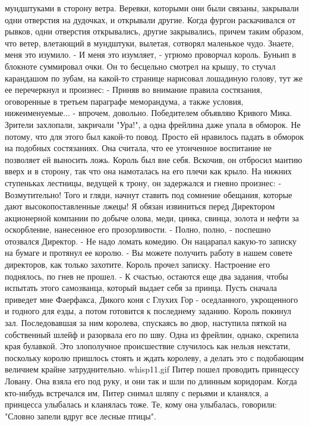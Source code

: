 мундштуками в сторону ветра. Веревки, которыми они были связаны, 
закрывали одни отверстия на дудочках, и открывали другие. Когда фургон 
раскачивался от рывков, одни отверстия открывались, другие 
закрывались, причем таким образом, что ветер, влетающий в мундштуки, 
вылетая, сотворял маленькое чудо. Знаете, меня это изумило.
    - И меня это изумляет, - угрюмо проворчал король.
    Буньип в блокноте суммировал очки. Он то бесцельно смотрел на 
крышу, то стучал карандашом по зубам, на какой-то странице нарисовал 
лошадиную голову, тут же ее перечеркнул и произнес:
    - Приняв во внимание правила состязания, оговоренные в третьем 
параграфе меморандума, а также условия, нижеименуемые... - впрочем, 
довольно. Победителем объявляю Кривого Мика.
    Зрители захлопали, закричали "Ура!", а одна фрейлина даже упала в 
обморок. Не потому, что для этого был какой-то повод. Просто ей 
нравилось падать в обморок на подобных состязаниях. Она считала, что 
ее утонченное воспитание не позволяет ей выносить ложь.
    Король был вне себя. Вскочив, он отбросил мантию вверх и в 
сторону, так что она намоталась на его плечи как крыло. На нижних 
ступеньках лестницы, ведущей к трону, он задержался и гневно произнес:
    - Возмутительно! Того и гляди, начнут ставить под сомнение 
обещания, которые дают высокопоставленные лжецы! Я обязан извиниться 
перед Директором акционерной компании по добыче олова, меди, цинка, 
свинца, золота и нефти за оскорбление, нанесенное его прозорливости.
    - Полно, полно, - поспешно отозвался Директор. - Не надо ломать 
комедию.
    Он нацарапал какую-то записку на бумаге и протянул ее королю.
    - Вы можете получить работу в нашем совете директоров, как только 
захотите.
    Король прочел записку. Настроение его поднялось, по гнев не 
прошел.
    - К счастью, остаются еще два задания, чтобы испытать этого 
самозванца, который выдает себя за принца. Пусть сначала приведет мне 
Фаерфакса, Дикого коня с Глухих Гор - оседланного, укрощенного и 
годного для езды, а потом готовится к последнему заданию.
    Король покинул зал. Последовавшая за ним королева, спускаясь во 
двор, наступила пяткой на собственный шлейф и разорвала его по шву. 
Одна из фрейлин, однако, скрепила края булавкой. Это злополучное 
происшествие случилось как нельзя некстати, поскольку королю пришлось 
стоять и ждать королеву, а делать это с подобающим величием крайне 
затруднительно.
    {whisp11.gif}
    Питер пошел проводить принцессу Ловану. Она взяла его под руку, и 
они так и шли по длинным коридорам. Когда кто-нибудь встречался им, 
Питер снимал шляпу с перьями и кланялся, а принцесса улыбалась и 
кланялась тоже. Те, кому она улыбалась, говорили: "Словно запели вдруг 
все лесные птицы".

